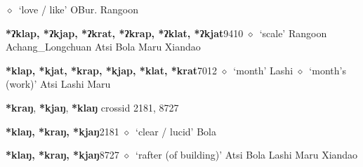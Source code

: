 \begin{list}{}{\leftmargin=1.5em \itemindent=-1.5em}
         $\diamond$~`love / like'
         OBur. 
\hspace{1ex}
         Rangoon 
  \item {\footnotesize \textbf{*ʔklap, *ʔkjap, *ʔkrat, *ʔkrap, *ʔklat, *ʔkjat}}{\tiny 9410}
\hspace{1ex}
         $\diamond$~`scale'
         Rangoon 
\hspace{1ex}
         Achang\_Longchuan 
\hspace{1ex}
         Atsi 
\hspace{1ex}
         Bola 
\hspace{1ex}
         Maru 
\hspace{1ex}
         Xiandao 
  \item {\footnotesize \textbf{*klap, *kjat, *krap, *kjap, *klat, *krat}}{\tiny 7012}
\hspace{1ex}
         $\diamond$~`month'
         Lashi 
\hspace{1ex}
         $\diamond$~`month's (work)'
         Atsi 
\hspace{1ex}
         Lashi 
\hspace{1ex}
         Maru 
  \end{list}
\item
\textbf{*kraŋ}, \textbf{*kjaŋ}, \textbf{*klaŋ}
  {\tiny crossid 2181, 8727}
  \begin{list}{}{\leftmargin=1.5em \itemindent=-1.5em}
  \item {\footnotesize \textbf{*klaŋ, *kraŋ, *kjaŋ}}{\tiny 2181}
         $\diamond$~`clear / lucid'
         Bola 
  \item {\footnotesize \textbf{*klaŋ, *kraŋ, *kjaŋ}}{\tiny 8727}
\hspace{1ex}
         $\diamond$~`rafter (of building)'
         Atsi 
\hspace{1ex}
         Bola 
\hspace{1ex}
         Lashi 
\hspace{1ex}
         Maru 
\hspace{1ex}
         Xiandao 
  \end{list}
